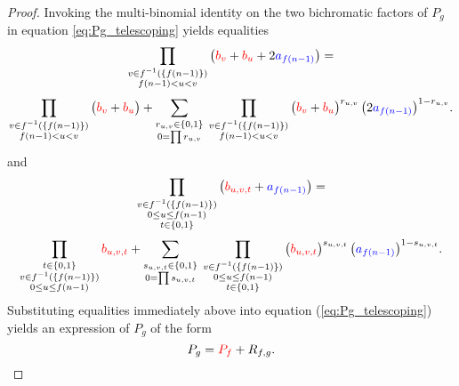 \begin{proof}
Invoking the {multi-binomial} identity on the two
bichromatic factors of $P_{g}$ in equation \eqref{eq:Pg_telescoping} yields equalities
\[
\prod_{\substack{v \in f^{-1}\left(\{f(n-1)\}\right) \\ f(n-1) < u < v}} \left(\textcolor{red}{b_v} + \textcolor{red}{b_u} + 2 \textcolor{blue}{a_{f(n-1)}}\right) =
\]
\[
\prod_{\substack{v \in f^{-1}\left(\{f(n-1)\}\right) \\ f(n-1) < u < v}} \big(\textcolor{red}{b_v} + \textcolor{red}{b_u}\big) 
+ \sum_{\substack{r_{u,v} \in \{0,1\} \\ 0 = \prod r_{u,v}}} \;
\prod_{\substack{v \in f^{-1}\left(\{f(n-1)\}\right) \\ f(n-1) < u < v}} \big(\textcolor{red}{b_v} + \textcolor{red}{b_u}\big)^{r_{u,v}} \, \big(2 \textcolor{blue}{a_{f(n-1)}}\big)^{1-r_{u,v}}.
\]
and
\[
\prod_{\substack{v \in f^{-1}\left(\{f(n-1)\}\right) \\ 0 \leq u \leq f(n-1) \\ t \in \{0,1\}}} \left(\textcolor{red}{b_{u,v,t}} + \textcolor{blue}{a_{f(n-1)}}\right) =
\]
\[
\prod_{\substack{t \in \{0,1\} \\ v \in f^{-1}\left(\{f(n-1)\}\right) \\ 0 \leq u \leq f(n-1)}} \textcolor{red}{b_{u,v,t}}
+ \sum_{\substack{s_{u,v,t} \in \{0,1\} \\ 0 = \prod s_{u,v,t}}} \; 
\prod_{\substack{v \in f^{-1}\left(\{f(n-1)\}\right) \\ 0 \leq u \leq f(n-1) \\ t \in \{0,1\}}} \big(\textcolor{red}{b_{u,v,t}}\big)^{s_{u,v,t}} \, \big(\textcolor{blue}{a_{f(n-1)}}\big)^{1-s_{u,v,t}}.
\]
Substituting equalities immediately above into equation (\ref{eq:Pg_telescoping})
yields an expression of $P_{g}$ of the form
\begin{equation}\label{eq:Pg-equals-Pf-plus-Rfg}
    P_{g}={\color{red}P_{f}}+R_{f,g}.
\end{equation}


\end{proof}
